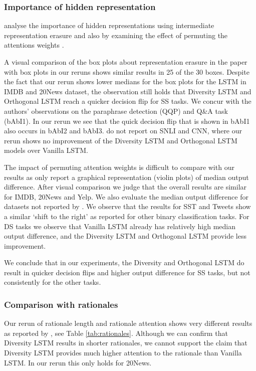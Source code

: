 \subsubsection{Importance of hidden representation} \citet{mohankumar_towards_2020} analyse the importance of hidden representations using intermediate representation erasure \citep{serrano-smith-2019-attention} and also by examining the effect of permuting the attentions weights \citep{jain-wallace-2019-attention}. 

A visual comparison of the box plots about representation erasure in the paper with box plots in our reruns shows similar results in 25 of the 30 boxes. Despite the fact that our rerun shows lower medians for the box plots for the LSTM in IMDB and 20News dataset, the observation still holds that Diversity LSTM and Orthogonal LSTM reach a quicker decision flip for SS tasks.
We concur with the authors' observations on the paraphrase detection (QQP) and Q\&A task (bAbI1). In our rerun we see that the quick decision flip that is shown in bAbI1 also occurs in bAbI2 and bAbI3. 
\citet{mohankumar_towards_2020} do not report on SNLI and CNN, where our rerun shows no improvement of the Diversity LSTM and Orthogonal LSTM models over Vanilla LSTM.

The impact of permuting attention weights is difficult to compare with our results as \citet{mohankumar_towards_2020} only report a graphical representation (violin plots) of median output difference. After visual comparison we judge that the overall results are similar for IMDB, 20News and Yelp. We also evaluate the median output difference for datasets not reported by \citet{mohankumar_towards_2020}. We observe that the results for SST and Tweets show a similar `shift to the right' as reported for other binary classification tasks. For DS tasks we observe that Vanilla LSTM already has relatively high median output difference, and the Diversity LSTM and Orthogonal LSTM provide less improvement.

We conclude that in our experiments, the Diversity and Orthogonal LSTM do result in quicker decision flips and higher output difference for SS tasks, but not consistently for the other tasks.


\subsubsection{Comparison with rationales} 
Our rerun of rationale length and rationale attention shows very different results as reported by \citet{mohankumar_towards_2020}, 
see Table \ref{tab:rationales}. Although we can confirm that Diversity LSTM results in shorter rationales, we cannot support the claim that Diversity LSTM provides much higher attention to the rationale than Vanilla LSTM. In our rerun this only holds for 20News.


